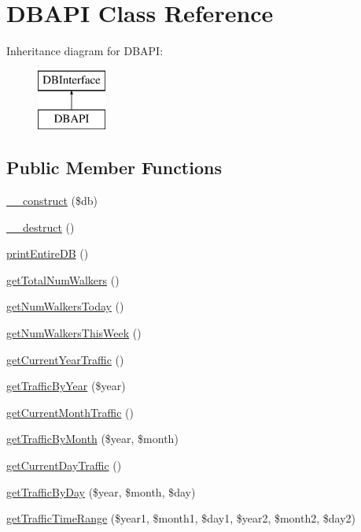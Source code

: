 \hypertarget{class_d_b_a_p_i}{}\section{D\+B\+A\+PI Class Reference}
\label{class_d_b_a_p_i}
Inheritance diagram for D\+B\+A\+PI\+:\begin{figure}[H]
\begin{center}
\leavevmode
\includegraphics[height=2.000000cm]{class_d_b_a_p_i}
\end{center}
\end{figure}
\subsection*{Public Member Functions}
\begin{DoxyCompactItemize}
\item 
\hyperlink{class_d_b_a_p_i_a800f8efee13692788b13ee57c5960092}{\+\_\+\+\_\+construct} (\$db)
\item 
\hyperlink{class_d_b_a_p_i_a421831a265621325e1fdd19aace0c758}{\+\_\+\+\_\+destruct} ()
\item 
\hyperlink{class_d_b_a_p_i_a7e02b55449fecf4bed4ca717f38dafd5}{print\+Entire\+DB} ()
\item 
\hyperlink{class_d_b_a_p_i_ab7a902c85d04b9973a30b73963cb3270}{get\+Total\+Num\+Walkers} ()
\item 
\hyperlink{class_d_b_a_p_i_adf40141a9763141c0eaeb9ce620181ad}{get\+Num\+Walkers\+Today} ()
\item 
\hyperlink{class_d_b_a_p_i_ae7a2342889cfd984513ba17ddbd14bef}{get\+Num\+Walkers\+This\+Week} ()
\item 
\hyperlink{class_d_b_a_p_i_ad487abf76c66536778a43009612b6843}{get\+Current\+Year\+Traffic} ()
\item 
\hyperlink{class_d_b_a_p_i_a82c5e558141dca62c793baf0d1216bc0}{get\+Traffic\+By\+Year} (\$year)
\item 
\hyperlink{class_d_b_a_p_i_ae1b5c3c8112356b5c8ea9184286ec89a}{get\+Current\+Month\+Traffic} ()
\item 
\hyperlink{class_d_b_a_p_i_a0e954fca184f4b8ac04f51cb0c558def}{get\+Traffic\+By\+Month} (\$year, \$month)
\item 
\hyperlink{class_d_b_a_p_i_a50aa5202dd6a6314b4b0da6fd3026415}{get\+Current\+Day\+Traffic} ()
\item 
\hyperlink{class_d_b_a_p_i_a732a3a52aedfb5dd4b63f7292cb8ec3b}{get\+Traffic\+By\+Day} (\$year, \$month, \$day)
\item 
\hyperlink{class_d_b_a_p_i_a546615c71715e031c6218799e97937ab}{get\+Traffic\+Time\+Range} (\$year1, \$month1, \$day1, \$year2, \$month2, \$day2)
\end{DoxyCompactItemize}


